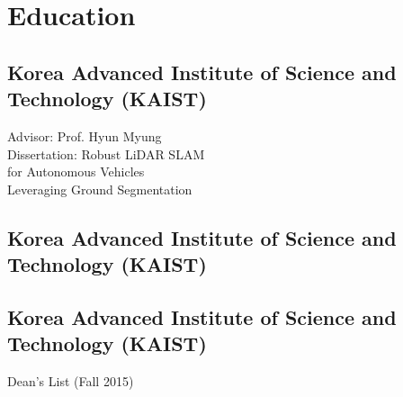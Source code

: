 \documentclass[]{deedy-resume-openfont}
\begin{document}
\begin{minipage}[t]{0.33\textwidth}
\section{Education}

\subsection{Korea Advanced Institute of Science and Technology (KAIST)}
Advisor: Prof. Hyun Myung \\
Dissertation: Robust LiDAR SLAM \\
for Autonomous Vehicles \\
Leveraging Ground Segmentation
\sectionsep

\subsection{Korea Advanced Institute of Science and Technology (KAIST)}
\sectionsep

\subsection{Korea Advanced Institute of Science and Technology (KAIST)}
Dean's List (Fall 2015)
\sectionsep

\end{minipage}
\hfill
%
%
\end{document}
